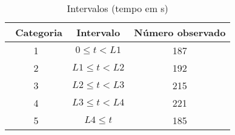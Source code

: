 \begin{table}[htpb]
\begin{center}
\begin{tabular}{ccc}
\toprule\
Categoria& Intervalo & Número observado \\\midrule 
1& $ 0 \leq t < L1$& 187 \\ 
2& $L1 \leq t < L2$& 192 \\ 
3& $L2 \leq t < L3$& 215 \\ 
4& $L3 \leq t < L4$& 221 \\ 
5& $L4 \leq t     $& 185 \\ 
\bottomrule
\end{tabular}
\end{center}
\caption{Intervalos (tempo em s)}
\label{tab:tabela4}
\end{table}

